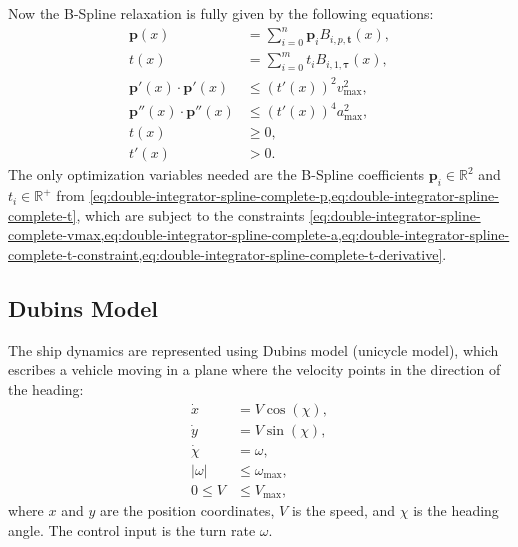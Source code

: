 Now the B-Spline relaxation is fully given by the following equations:
\begin{subequations}\label{eq:double-integrator-spline-complete}
    \begin{align}
        \mathbf{p}(x) &= \sum_{i=0}^{n} \mathbf{p}_i B_{i,p,\mathbf{t}}(x), \label{eq:double-integrator-spline-complete-p} \\
        t(x) &= \sum_{i=0}^{m} t_i B_{i,1,\boldsymbol{\tau}}(x), \label{eq:double-integrator-spline-complete-t} \\
        \mathbf{p}'(x) \cdot \mathbf{p}'(x) &\leq (t'(x))^2v_{\max}^2, \label{eq:double-integrator-spline-complete-vmax} \\
        \mathbf{p}''(x) \cdot \mathbf{p}''(x) &\leq (t'(x))^4a_{\max}^2, \label{eq:double-integrator-spline-complete-a} \\
        t(x) &\geq 0, \label{eq:double-integrator-spline-complete-t-constraint} \\
        t'(x) &> 0. \label{eq:double-integrator-spline-complete-t-derivative} \end{align}
\end{subequations}
The only optimization variables needed are the B-Spline coefficients $\mathbf{p}_i\in\mathbb{R}^2$ and $t_i\in\mathbb{R}^+$ from \cref{eq:double-integrator-spline-complete-p,eq:double-integrator-spline-complete-t}, which are subject to the constraints \cref{eq:double-integrator-spline-complete-vmax,eq:double-integrator-spline-complete-a,eq:double-integrator-spline-complete-t-constraint,eq:double-integrator-spline-complete-t-derivative}.


\subsection{Dubins Model}
The ship dynamics are represented using Dubins model (unicycle model), which escribes a vehicle moving in a plane where the velocity points in the direction of the heading:
\begin{subequations}\label{eq:dubins-model}
    \begin{align}
        \dot x &= V \cos(\chi),       \label{eq:dubins-x} \\
        \dot y &= V \sin(\chi),       \label{eq:dubins-y} \\
        \dot \chi &= \omega,          \label{eq:dubins-chi} \\
        |\omega| &\leq \omega_{\max}, \label{eq:dubins-omega} \\
        0 \leq V &\leq V_{\max},      \label{eq:dubins-V} 
    \end{align}
\end{subequations}
where $x$ and $y$ are the position coordinates, $V$ is the speed, and $\chi$ is the heading angle. The control input is the turn rate $\omega$.

